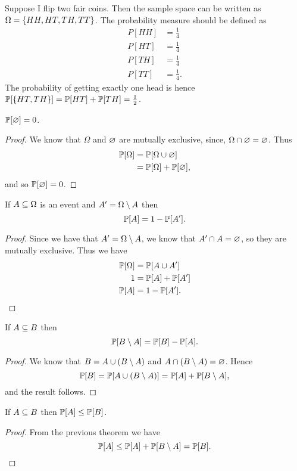 \documentclass[class=article, crop=false]{standalone}
\begin{document}
  \begin{example}{}
    Suppose I flip two fair coins. Then the sample space can be written as $\Omega = \set{HH, HT, TH, TT}$. The probability measure should be defined as
    \begin{align*}
      P[HH] &= \frac{1}{4} \\ 
      P[HT] &= \frac{1}{4} \\ 
      P[TH] &= \frac{1}{4} \\ 
      P[TT] &= \frac{1}{4}.
    \end{align*}
    The probability of getting exactly one head is hence $\P[\set{HT, TH}] = \mathbb{P}[HT] + \mathbb{P}[TH] = \frac{1}{2}$.
  \end{example}
  \begin{theorem}{}
    $\P[\es] = 0$.
    \begin{proof}
      We know that $\Omega$ and $\es$ are mutually exclusive, since, $\Omega\cap \es = \es$. Thus
      \begin{align*}
        \P[\Omega] &= \P[\Omega\cup \es] \\
                  &= \P[\Omega] + \P[\es],
      \end{align*}
      and so $\P[\es] = 0$.
    \end{proof}
  \end{theorem}
  \begin{theorem}{}
    If $A\sse \Omega$ is an event and $A' = \Omega\sm A$ then
    \[
      \P[A] = 1 - \P[A'].
    \]
    \begin{proof}
      Since we have that $A' = \Omega\sm A$, we know that $A'\cap A = \es$, so they are mutually exclusive. Thus we have
      \begin{align*}
        \P[\Omega] &= \P[A\cup A'] \\
        1 &= \P[A] + \P[A'] \\ 
        \P[A] &= 1 - \P[A'].
      \end{align*}
    \end{proof}
  \end{theorem}
  \begin{theorem}{}
    If $A\sse B$ then
    \[
      \P[B\sm A] = \P[B] - \P[A].
    \]
    \begin{proof}
      We know that $B = A\cup (B\sm A)$ and $A\cap(B\sm A) = \es$. Hence 
      \[
        \P[B] = \P[A\cup (B\sm A)] = \P[A] + \P[B\sm A],
      \]
      and the result follows.
    \end{proof}
  \end{theorem}
  \begin{theorem}{}
    If $A\sse B$ then $\P[A]\leq \P[B]$.
    \begin{proof}
      From the previous theorem we have
      \[
        \P[A]\leq \P[A] + \P[B\sm A] = \P[B].
      \]
    \end{proof}
  \end{theorem}
\end{document}
